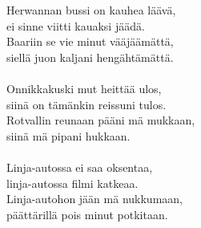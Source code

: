 
Herwannan bussi on kauhea läävä, \\ ei sinne viitti kauaksi jäädä. \\ Baariin se vie minut vääjäämättä, \\ siellä juon kaljani hengähtämättä. \\ \hspace{10mm} \\ Onnikkakuski mut heittää ulos, \\ siinä on tämänkin reissuni tulos. \\ Rotvallin reunaan pääni mä mukkaan, \\ siinä mä pipani hukkaan. \\ \hspace{10mm} \\ Linja-autossa ei saa oksentaa, \\ linja-autossa filmi katkeaa. \\ Linja-autohon jään mä nukkumaan, \\ päättärillä pois minut potkitaan.